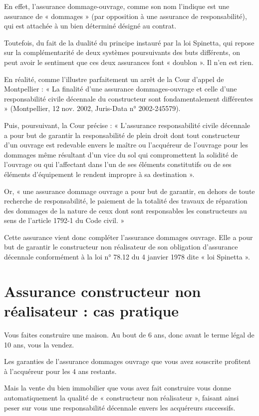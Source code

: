 En effet, l'assurance dommage-ouvrage, comme son nom l'indique est une assurance de « dommages » (par opposition à une assurance de responsabilité), qui est attachée à un bien déterminé désigné au contrat.

Toutefois, du fait de la dualité du principe instauré par la loi Spinetta, qui repose sur la complémentarité de deux systèmes poursuivants des buts différents, on peut avoir le sentiment que ces deux assurances font « doublon ». Il n'en est rien.

En réalité, comme l'illustre parfaitement un arrêt de la Cour d'appel de Montpellier : « La finalité d'une assurance dommages-ouvrage et celle d'une responsabilité civile décennale du constructeur sont fondamentalement différentes » (Montpellier, 12 nov. 2002, Juris-Data n° 2002-245579).

Puis, poursuivant, la Cour précise : « L'assurance responsabilité civile décennale a pour but de garantir la responsabilité de plein droit dont tout constructeur d'un ouvrage est redevable envers le maître ou l'acquéreur de l'ouvrage pour les dommages même résultant d'un vice du sol qui compromettent la solidité de l'ouvrage ou qui l'affectant dans l'un de ses éléments constitutifs ou de ses éléments d'équipement le rendent impropre à sa destination ».

Or, « une assurance dommage ouvrage a pour but de garantir, en dehors de toute recherche de responsabilité, le paiement de la totalité des travaux de réparation des dommages de la nature de ceux dont sont responsables les constructeurs au sens de l'article 1792-1 du Code civil. »

Cette assurance vient donc compléter l'assurance dommages ouvrage. Elle a pour but de garantir le constructeur non réalisateur de son obligation d'assurance décennale conformément à la loi n° 78.12 du 4 janvier 1978 dite « loi Spinetta ».

\section{Assurance constructeur non réalisateur : cas pratique}

Vous faites construire une maison. Au bout de 6 ans, donc avant le terme légal de 10 ans, vous la vendez.

Les garanties de l'assurance dommages ouvrage que vous avez souscrite profitent à l'acquéreur pour les 4 ans restants.

Mais la vente du bien immobilier que vous avez fait construire vous donne automatiquement la qualité de « constructeur non réalisateur », faisant ainsi peser sur vous une responsabilité décennale envers les acquéreurs successifs.


